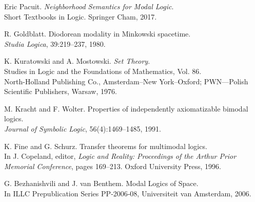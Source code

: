 \documentclass[12pt, a4paper]{scrartcl}
\begin{document}
\begin{enumerate}[label={[{\arabic*}]}]
\item Eric Pacuit. \textit{Neighborhood Semantics for Modal Logic}.\\
Short Textbooks in Logic. Springer Cham, 2017.

\item R. Goldblatt. Diodorean modality in Minkowski spacetime.\\
\textit{Studia Logica}, 39:219–237, 1980.

\item K. Kuratowski and A. Mostowski. \textit{Set Theory}.\\
Studies in Logic and the Foundations of Mathematics, Vol. 86.\\
North-Holland Publishing Co., Amsterdam–New York–Oxford; PWN—Polish Scientific Publishers, Warsaw, 1976.

\item M. Kracht and F. Wolter. Properties of independently axiomatizable bimodal logics.\\
\textit{Journal of Symbolic Logic}, 56(4):1469–1485, 1991.

\item K. Fine and G. Schurz. Transfer theorems for multimodal logics.\\
In J. Copeland, editor, \textit{Logic and Reality: Proceedings of the Arthur Prior Memorial Conference}, pages 169–213. Oxford University Press, 1996.

\item G. Bezhanishvili and J. van Benthem. Modal Logics of Space.\\
In ILLC Prepublication Series PP‑2006‑08, Universiteit van Amsterdam, 2006.

\end{enumerate}
\end{document}

